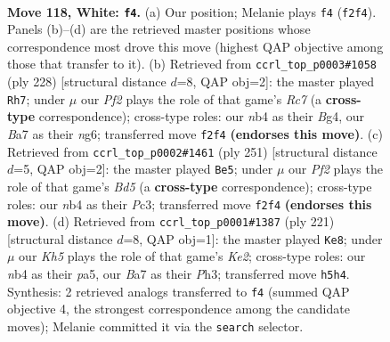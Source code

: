 \documentclass[11pt]{article}
\begin{document}
\clearpage

\begin{figure}[p]\centering
\begin{subfigure}{0.46\textwidth}\centering
\resizebox{\linewidth}{!}{%
\newchessgame
\chessboard[
  setfen={6k1/B7/8/7K/1nb5/8/5P2/8 w - - 81 118},
  showmover=false,
  pgfstyle=straightmove, color=movearrow, markmove={f2-f4}
]}
\caption{}
\end{subfigure}\hfill
\begin{subfigure}{0.46\textwidth}\centering
\resizebox{\linewidth}{!}{%
\newchessgame
\chessboard[
  setfen={8/2R5/5bn1/3K4/6B1/8/1k6/8 w - - 69 115},
  showmover=false,
  pgfstyle=straightmove, color=movearrow, markmove={c7-h7}
]}
\caption{}
\end{subfigure}
\\[4pt]
\begin{subfigure}{0.46\textwidth}\centering
\resizebox{\linewidth}{!}{%
\newchessgame
\chessboard[
  setfen={6k1/4B3/6K1/8/3b4/2p5/2B5/8 b - - 15 126},
  showmover=false,
  pgfstyle=straightmove, color=movearrow, markmove={d4-e5}
]}
\caption{}
\end{subfigure}\hfill
\begin{subfigure}{0.46\textwidth}\centering
\resizebox{\linewidth}{!}{%
\newchessgame
\chessboard[
  setfen={8/B3k3/p7/P7/6b1/7p/8/6K1 b - - 9 111},
  showmover=false,
  pgfstyle=straightmove, color=movearrow, markmove={e7-e8}
]}
\caption{}
\end{subfigure}
\caption{\textbf{Move 118, White: \texttt{f4}.} (a) Our position; Melanie plays \texttt{f4} (\texttt{f2f4}). Panels (b)--(d) are the retrieved master positions whose correspondence most drove this move (highest QAP objective among those that transfer to it). (b) Retrieved from \texttt{ccrl\_top\_p0003\#1058} (ply 228) [structural distance $d$=8, QAP obj=2]: the master played \texttt{Rh7}; under $\mu$ our \emph{Pf2} plays the role of that game's \emph{Rc7} (a \textbf{cross-type} correspondence); cross-type roles: our \emph{n}b4 as their \emph{B}g4, our \emph{B}a7 as their \emph{n}g6; transferred move \texttt{f2f4} \textbf{(endorses this move)}. (c) Retrieved from \texttt{ccrl\_top\_p0002\#1461} (ply 251) [structural distance $d$=5, QAP obj=2]: the master played \texttt{Be5}; under $\mu$ our \emph{Pf2} plays the role of that game's \emph{Bd5} (a \textbf{cross-type} correspondence); cross-type roles: our \emph{n}b4 as their \emph{P}c3; transferred move \texttt{f2f4} \textbf{(endorses this move)}. (d) Retrieved from \texttt{ccrl\_top\_p0001\#1387} (ply 221) [structural distance $d$=8, QAP obj=1]: the master played \texttt{Ke8}; under $\mu$ our \emph{Kh5} plays the role of that game's \emph{Ke2}; cross-type roles: our \emph{n}b4 as their \emph{p}a5, our \emph{B}a7 as their \emph{P}h3; transferred move \texttt{h5h4}. Synthesis: 2 retrieved analogs transferred to \texttt{f4} (summed QAP objective 4, the strongest correspondence among the candidate moves); Melanie committed it via the \texttt{search} selector.}
\label{fig:thought-m234}
\end{figure}
\end{document}
